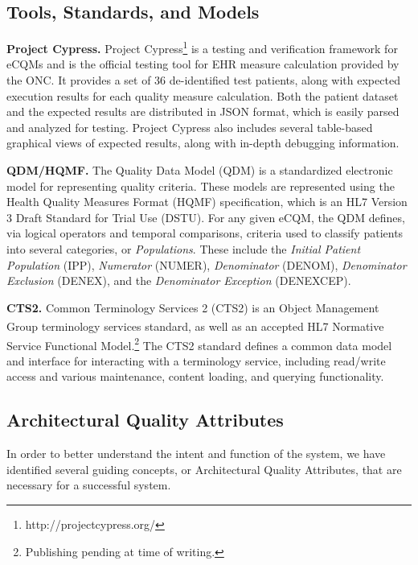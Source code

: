 \documentclass{amia}
\begin{document}
\subsection{Tools, Standards, and Models}
\textbf{Project Cypress.}
Project Cypress\footnote{http://projectcypress.org/} is a testing and verification framework for eCQMs and is the official testing tool for EHR measure calculation provided by the ONC. It provides a set of 36 de-identified test patients, along with expected execution results for each quality measure calculation. Both the patient dataset and the expected results are distributed in JSON format\cite{crockford2006application}, which is easily parsed and analyzed for testing. Project Cypress also includes several table-based graphical views of expected results, along with in-depth debugging information. 

\textbf{QDM/HQMF.}
The Quality Data Model (QDM)\cite{behilngquality,qdm_spec} is a standardized electronic model for representing quality criteria. These models are represented using the Health Quality Measures Format (HQMF)\cite{hqmf_dstu} specification, which is an HL7 Version 3 Draft Standard for Trial Use (DSTU). For any given eCQM, the QDM defines, via logical operators and temporal comparisons, criteria used to classify patients into several categories, or \textit{Populations}. These include the \textit{Initial Patient Population} (IPP), \textit{Numerator} (NUMER), \textit{Denominator} (DENOM), \textit{Denominator Exclusion} (DENEX), and the \textit{Denominator Exception} (DENEXCEP)\cite{li2012modeling}.

\textbf{CTS2.}
Common Terminology Services 2 (CTS2) is an Object Management Group{\textsuperscript{\textregistered}} terminology services standard\cite{cts2}, as well as an accepted HL7 Normative Service Functional Model.\footnote{Publishing pending at time of writing.} The CTS2 standard defines a common data model and interface for interacting with a terminology service, including read/write access and various maintenance, content loading, and querying functionality.

\subsection{Architectural Quality Attributes}

In order to better understand the intent and function of the system, we have identified several guiding concepts, or Architectural Quality Attributes\cite{o2007quality}, that are necessary for a successful system.
\end{document}
